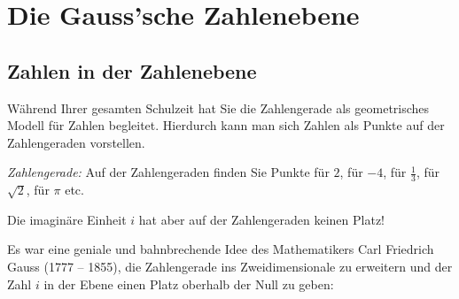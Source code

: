 \section{Die Gauss'sche Zahlenebene}
\subsection{Zahlen in der Zahlenebene}
Während Ihrer gesamten Schulzeit hat Sie die Zahlengerade als geometrisches Modell für Zahlen begleitet. Hierdurch kann man sich Zahlen als Punkte auf der Zahlengeraden vorstellen. 

\textit{Zahlengerade:} Auf der Zahlengeraden finden Sie Punkte für $2$, für $-4$, für $\frac{1}{3}$, für $\sqrt{2}$, für $\pi$ etc. 

\begin{center}
\end{center}




Die imaginäre Einheit $i$ hat aber auf der Zahlengeraden keinen Platz!

Es war eine geniale und bahnbrechende Idee des Mathematikers Carl Friedrich Gauss (1777 – 1855), die Zahlengerade ins Zweidimensionale zu erweitern und der Zahl $i$ in der Ebene einen Platz oberhalb der Null zu geben:

\begin{center}
\end{center}

